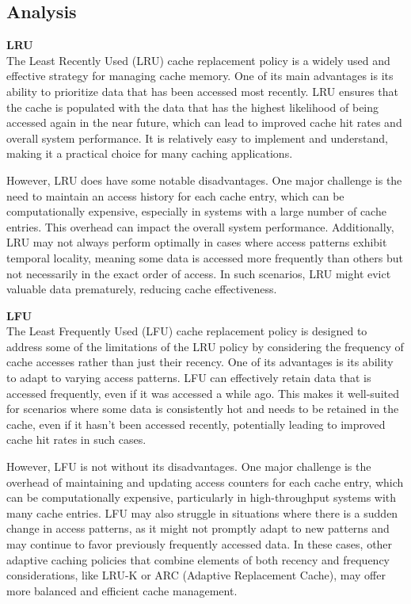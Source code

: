 \documentclass{article}
\begin{document}
\subsection{Analysis}
\begin{description}
\item \textbf{LRU} \\
The Least Recently Used (LRU) cache replacement policy is a widely used and effective strategy for managing cache memory. One of its main advantages is its ability to prioritize data that has been accessed most recently. LRU ensures that the cache is populated with the data that has the highest likelihood of being accessed again in the near future, which can lead to improved cache hit rates and overall system performance. It is relatively easy to implement and understand, making it a practical choice for many caching applications.

However, LRU does have some notable disadvantages. One major challenge is the need to maintain an access history for each cache entry, which can be computationally expensive, especially in systems with a large number of cache entries. This overhead can impact the overall system performance. Additionally, LRU may not always perform optimally in cases where access patterns exhibit temporal locality, meaning some data is accessed more frequently than others but not necessarily in the exact order of access. In such scenarios, LRU might evict valuable data prematurely, reducing cache effectiveness.

\item \textbf{LFU} \\
The Least Frequently Used (LFU) cache replacement policy is designed to address some of the limitations of the LRU policy by considering the frequency of cache accesses rather than just their recency. One of its advantages is its ability to adapt to varying access patterns. LFU can effectively retain data that is accessed frequently, even if it was accessed a while ago. This makes it well-suited for scenarios where some data is consistently hot and needs to be retained in the cache, even if it hasn't been accessed recently, potentially leading to improved cache hit rates in such cases.

However, LFU is not without its disadvantages. One major challenge is the overhead of maintaining and updating access counters for each cache entry, which can be computationally expensive, particularly in high-throughput systems with many cache entries. LFU may also struggle in situations where there is a sudden change in access patterns, as it might not promptly adapt to new patterns and may continue to favor previously frequently accessed data. In these cases, other adaptive caching policies that combine elements of both recency and frequency considerations, like LRU-K or ARC (Adaptive Replacement Cache), may offer more balanced and efficient cache management.


\end{description}
\end{document}
